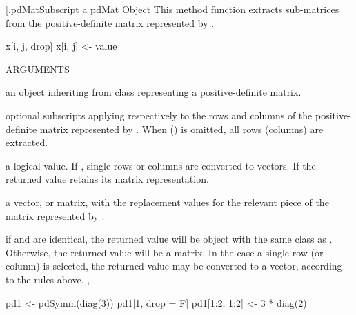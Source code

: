 \documentclass[pdftex]{article} \usepackage{url,graphicx}
\begin{document}
\begin{Helpfile}{[.pdMat}{Subscript a pdMat Object}
This method function extracts sub-matrices from the positive-definite
matrix represented by .
\begin{Example}
x[i, j, drop]
x[i, j] <- value
\end{Example}
\begin{Argument}{ARGUMENTS}
\item[\Co{x:}]
an object inheriting from class  representing a
positive-definite matrix.
\item[\Co{i, j:}]
optional subscripts applying respectively to the rows
and columns of the positive-definite matrix represented by
. When  () is omitted, all rows (columns)
are extracted.
\item[\Co{drop:}]
a logical value. If , single rows or columns are
converted to vectors. If  the returned value retains its
matrix representation.
\item[\Co{value:}]
a vector, or matrix, with the replacement values for the
relevant piece of the matrix represented by .
\end{Argument}
if  and  are identical, the returned value will be
 object with the same class as . Otherwise, the
returned value will be a matrix. In the case a single row (or column)
is selected, the returned value may be converted to a vector,
according to the rules above.
\Co{[}, 
\need 15pt
\vspace{-16pt} 
\begin{Example}
pd1 <- pdSymm(diag(3))
pd1[1, drop = F]
pd1[1:2, 1:2] <- 3 * diag(2)
\end{Example}
\end{Helpfile}
\end{document}
